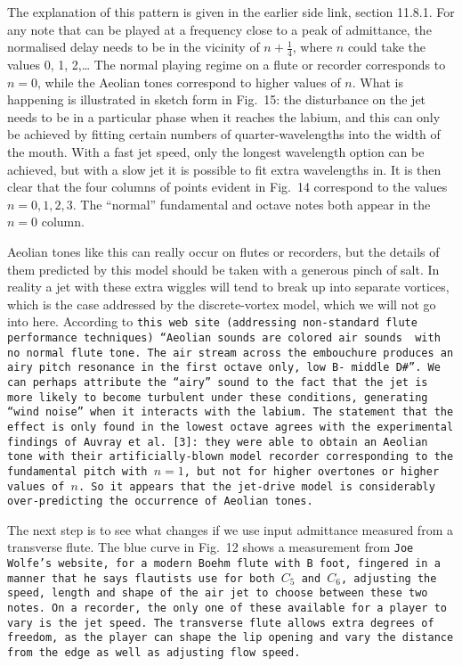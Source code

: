   The explanation of this pattern is given in the earlier side link, section 
  11.8.1. For any note that can be played at a frequency close to a peak of 
  admittance, the normalised delay needs to be in the vicinity of 
  $n+\frac{1}{4}$, where $n$ could take the values 0, 1, 2,… The normal playing 
  regime on a flute or recorder corresponds to $n=0$, while the Aeolian tones 
  correspond to higher values of $n$. What is happening is illustrated in 
  sketch form in Fig.\ 15: the disturbance on the jet needs to be in a 
  particular phase when it reaches the labium, and this can only be achieved by 
  fitting certain numbers of quarter-wavelengths into the width of the mouth. 
  With a fast jet speed, only the longest wavelength option can be achieved, 
  but with a slow jet it is possible to fit extra wavelengths in. It is then 
  clear that the four columns of points evident in Fig.\ 14 correspond to the 
  values $n=0,1,2,3$. The ``normal'' fundamental and octave notes both appear 
  in the $n=0$ column. 


  Aeolian tones like this can really occur on flutes or recorders, but the 
  details of them predicted by this model should be taken with a generous pinch 
  of salt. In reality a jet with these extra wiggles will tend to break up into 
  separate vortices, which is the case addressed by the discrete-vortex model, 
  which we will not go into here. According to \tt{}this web site\rm{} 
  (addressing non-standard flute performance techniques) “Aeolian sounds are 
  colored air sounds ~with no normal flute tone. The~air stream across the 
  embouchure produces an airy pitch resonance in the~first octave~only, low B- 
  middle D\#”. We can perhaps attribute the ``airy'' sound to the fact that the 
  jet is more likely to become turbulent under these conditions, generating 
  ``wind noise'' when it interacts with the labium. The statement that the 
  effect is only found in the lowest octave agrees with the experimental 
  findings of Auvray et al. [3]: they were able to obtain an Aeolian tone with 
  their artificially-blown model recorder corresponding to the fundamental 
  pitch with $n=1$, but not for higher overtones or higher values of $n$. So it 
  appears that the jet-drive model is considerably over-predicting the 
  occurrence of Aeolian tones. 

  The next step is to see what changes if we use input admittance measured from 
  a transverse flute. The blue curve in Fig.\ 12 shows a measurement from 
  \tt{}Joe Wolfe’s website\rm{}, for a modern Boehm flute with B foot, fingered 
  in a manner that he says flautists use for both $C_5$ and $C_6$, adjusting 
  the speed, length and shape of the air jet to choose between these two notes. 
  On a recorder, the only one of these available for a player to vary is the 
  jet speed. The transverse flute allows extra degrees of freedom, as the 
  player can shape the lip opening and vary the distance from the edge as well 
  as adjusting flow speed. 

